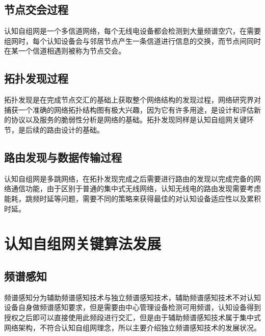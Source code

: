 \documentclass[a4paper,AutoFakeBold,oneside,12pt]{book}
\begin{document}
\subsection{节点交会过程}
  认知自组网是一个多信道网络，每个无线电设备都会检测到大量频谱空穴，在需要组网时，每个认知设备会与邻居节点产生一条信道进行信息的交换，而节点间同时在某一个信道相遇则被称为节点交会。
\subsection{拓扑发现过程}
  拓扑发现是在完成节点交汇的基础上获取整个网络结构的发现过程，网络研究界对捕获一个准确的网络拓扑结构图有极大兴趣，因为它有许多用途，是设计和评估新的协议以及服务的脆弱性分析是网络的基础。拓扑发现同样是认知自组网关键环节，是后续的路由设计的基础。
\subsection{路由发现与数据传输过程}
  认知自组网是多跳网络，在拓扑发现完成之后需要进行路由的发现以完成完备的网络通信功能，由于区别于普通的集中式无线网络，认知无线电的路由发现需要考虑能耗，跳频时延等问题，需要不同的策略来获得最佳的对认知设备适应性以及累积时延。
\section{认知自组网关键算法发展}
  
\subsection{频谱感知}
  频谱感知分为辅助频谱感知技术与独立频谱感知技术，辅助频谱感知技术不对认知设备自身做频谱感知要求，但是需要由中心管理设备检测可用频谱，认知设备得到授权之后即可以直接使用此频段进行交汇，但是由于辅助频谱感知技术属于集中式网络架构，不符合认知自组网理念，所以主要介绍独立频谱感知技术的发展状况。
\end{document}
